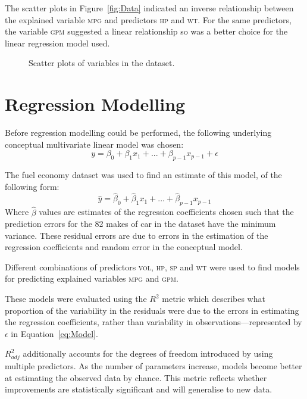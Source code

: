 \documentclass[a4paper,10pt,twocolumn]{article}
\newcommand{\MPG}{\textsc{mpg}\xspace}
\newcommand{\GPM}{\textsc{gpm}\xspace}
\newcommand{\VOL}{\textsc{vol}\xspace}
\newcommand{\HP}{\textsc{hp}\xspace}
\newcommand{\SP}{\textsc{sp}\xspace}
\newcommand{\WT}{\textsc{wt}\xspace}
\begin{document}
The scatter plots in Figure~\vref{fig:Data} indicated an inverse relationship 
between the explained variable \MPG and predictors \HP and \WT. For the same 
predictors, the variable \GPM suggested a linear relationship so was a 
better choice for the linear regression model used.

\begin{figure}[h]
    \centering
    \def\svgwidth{0.5\textwidth}
    
    \caption{Scatter plots of variables in the dataset.}
    \label{fig:Data}
\end{figure}

\section{Regression Modelling}

Before regression modelling could be performed, the following underlying 
conceptual multivariate linear model was chosen:
\begin{equation}
    y = \beta_0 + \beta_1 x_1 + ... + \beta_{p-1}x_{p-1} + \epsilon
    \label{eq:Model}
\end{equation}

The fuel economy dataset was used to find an estimate of this model, of the 
following form:
\begin{equation}
    \hat{y} = \hat{\beta}_0 + \hat{\beta}_1 x_1 + ... + \hat{\beta}_{p-1}x_{p-1}
    \label{eq:Estimate}
\end{equation}
Where $\hat{\beta}$ values are estimates of the regression coefficients chosen 
such that the prediction errors for the 82 makes of car in the dataset have the 
minimum variance. These residual errors are due to errors in the estimation of 
the regression coefficients and random error in the conceptual model.

Different combinations of predictors \VOL, \HP, \SP and \WT were used to find 
models for predicting explained variables \MPG and \GPM.

These models were evaluated using the $R^2$ metric which describes what  
proportion of the variability in the residuals were due to the errors in 
estimating the regression coefficients, rather than variability in 
observations---represented by $\epsilon$ in Equation~\vref{eq:Model}.

$R_{adj}^2$ additionally accounts for the degrees of freedom introduced by 
using multiple predictors. As the number of parameters increase, models become 
better at estimating the observed data by chance. This metric reflects whether 
improvements are statistically significant and will generalise to new data.
\end{document}
